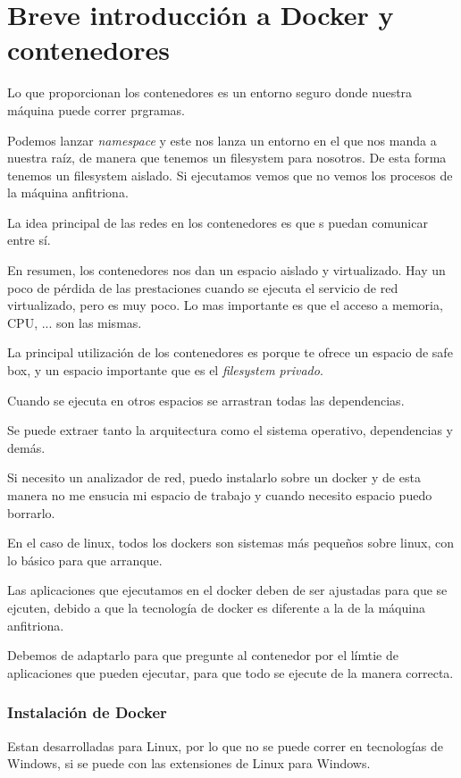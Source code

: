 \section{Breve introducción a Docker y contenedores}

Lo que proporcionan los contenedores es un entorno seguro donde nuestra máquina puede correr prgramas.

Podemos lanzar \textit{namespace} y este nos lanza un entorno en el que nos manda a nuestra raíz, de manera que tenemos un filesystem para nosotros. De esta forma tenemos un filesystem aislado. Si ejecutamos  vemos que no vemos los procesos de la máquina anfitriona.   

La idea principal de las redes en los contenedores es que s puedan comunicar entre sí.

En resumen, los contenedores nos dan un espacio aislado y virtualizado. Hay un poco de pérdida de las prestaciones cuando se ejecuta el servicio de red virtualizado, pero es muy poco. Lo mas importante es que el acceso a memoria, CPU, ... son las mismas.

La principal utilización de los contenedores es porque te ofrece un espacio de safe box, y un espacio importante que es el \textit{filesystem privado}. 

Cuando se ejecuta en otros espacios se arrastran todas las dependencias.

Se puede extraer tanto la arquitectura como el sistema operativo, dependencias y demás.

Si necesito un analizador de red, puedo instalarlo sobre un docker y de esta manera no me ensucia mi espacio de trabajo y cuando necesito espacio puedo borrarlo.

En el caso de linux, todos los dockers son sistemas más pequeños sobre linux, con lo básico para que arranque.

Las aplicaciones que ejecutamos en el docker deben de ser ajustadas para que se ejcuten, debido a que la tecnología de docker es diferente a la de la máquina anfitriona.

Debemos de adaptarlo para que pregunte al contenedor por el límtie de aplicaciones que pueden ejecutar, para que todo se ejecute de la manera correcta.

\subsubsection*{Instalación de Docker}

Estan desarrolladas para Linux, por lo que no se puede correr en tecnologías de Windows, si se puede con las extensiones de Linux para Windows.

